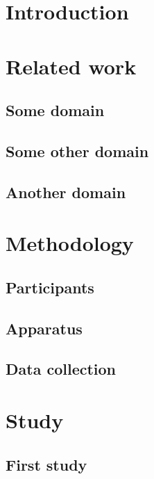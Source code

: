 \section{Introduction}

\kant[1-2]



\section{Related work}

\subsection{Some domain}
\kant[10]

\subsection{Some other domain}
\kant[11]

\subsection{Another domain}
\kant[12]



\section{Methodology}

\subsection{Participants}
\kant[20]

\subsection{Apparatus}
\kant[21]

\subsection{Data collection}
\kant[22]



\section{Study}

\subsection{First study}
\kant[30-33]

